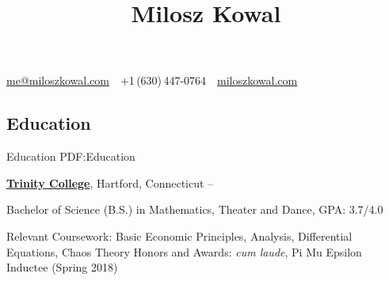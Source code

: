 \documentclass[letterpaper,10pt,oneside]{article}
\newcommand{\CVAuthor}{Milosz Kowal}
\newcommand{\CVWebpage}{https://miloszkowal.com}
\begin{document}

\title{\CVAuthor}

\begin{subtitle}
\par
\href{mailto:me@miloszkowal.com}
{me@miloszkowal.com}
\,\SubBulletSymbol\,
+1\,(630)\,447-0764
\,\SubBulletSymbol\,
\href{\CVWebpage}
{miloszkowal.com}
\end{subtitle}

\begin{body}


\section
{Education}
{Education}
{PDF:Education}

\href{http://www.trincoll.edu}
{\textbf{Trinity College}},
Hartford, Connecticut
\hfill
{} --

\GapNoBreak
\BulletItem
Bachelor of Science (B.S.) in
{Mathematics, Theater and Dance, GPA: 3.7/4.0}
\begin{detail}
\SubBulletItem
Relevant Coursework: Basic Economic Principles, Analysis, Differential Equations, Chaos Theory
\SubBulletItem
Honors and Awards: \textit{cum laude}, Pi Mu Epsilon Inductee (Spring 2018)
\end{detail}




\end{body}
\end{document}
